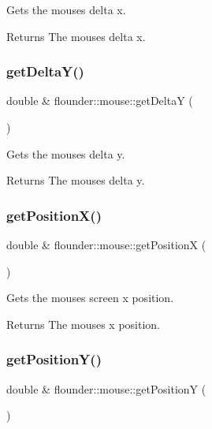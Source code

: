 Gets the mouses delta x. 

\begin{DoxyReturn}{Returns}
The mouses delta x. 
\end{DoxyReturn}
\mbox{\label{classflounder_1_1mouse_ae252e366acee241385420000dc23b748}} 
\subsubsection{\texorpdfstring{get\+Delta\+Y()}{getDeltaY()}}
{\footnotesize\ttfamily double \& flounder\+::mouse\+::get\+DeltaY (\begin{DoxyParamCaption}{ }\end{DoxyParamCaption})}



Gets the mouses delta y. 

\begin{DoxyReturn}{Returns}
The mouses delta y. 
\end{DoxyReturn}
\mbox{\label{classflounder_1_1mouse_a2e442682cc73d6bcb2be7702c17d1dff}} 
\subsubsection{\texorpdfstring{get\+Position\+X()}{getPositionX()}}
{\footnotesize\ttfamily double \& flounder\+::mouse\+::get\+PositionX (\begin{DoxyParamCaption}{ }\end{DoxyParamCaption})}



Gets the mouses screen x position. 

\begin{DoxyReturn}{Returns}
The mouses x position. 
\end{DoxyReturn}
\mbox{\label{classflounder_1_1mouse_abd3a3246b13da0b537d632057398cf7d}} 
\subsubsection{\texorpdfstring{get\+Position\+Y()}{getPositionY()}}
{\footnotesize\ttfamily double \& flounder\+::mouse\+::get\+PositionY (\begin{DoxyParamCaption}{ }\end{DoxyParamCaption})}



